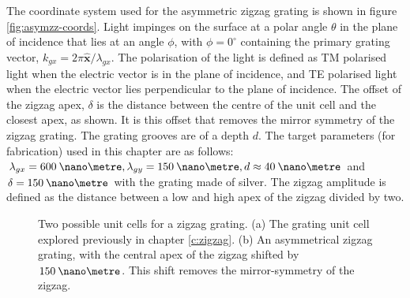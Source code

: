 The coordinate system used for the asymmetric zigzag grating is shown in figure \ref{fig:asymzz-coords}. Light impinges on the surface at a polar angle $\theta$ in the plane of incidence that lies at an angle $\phi$, with $\phi=0^\circ$ containing the primary grating vector, $k_{gx}=2\pi\hat{\mathbf{x}}/\lambda_{gx}$. The polarisation of the light is defined as TM polarised light when the electric vector is in the plane of incidence, and TE polarised light when the electric vector lies perpendicular to the plane of incidence. The offset of the zigzag apex, $\delta$ is the distance between the centre of the unit cell and the closest apex, as shown. It is this offset that removes the mirror symmetry of the zigzag grating. The grating grooves are of a depth $d$. The target parameters (for fabrication) used in this chapter are as follows:  ${\lambda_{gx}=600\:\nano\metre}, {\lambda_{gy}=150\:\nano\metre}, {d\approx 40\:\nano\metre}$ and ${\delta=150 \:\nano\metre}$ with the grating made of silver. The zigzag amplitude is defined as the distance between a low and high apex of the zigzag divided by two.  

\begin{figure}
\begin{center}
\end{center}
\caption[Two possible unit cells for a zigzag grating: symmetric and asymmetric.]{Two possible unit cells for a zigzag grating. (a) The grating unit cell explored previously in chapter \ref{c:zigzag}. (b) An asymmetrical zigzag grating, with the central apex of the zigzag shifted by $150\:\nano\metre$. This shift removes the mirror-symmetry of the zigzag.\label{fig:azz-unitcells}}
\end{figure}

